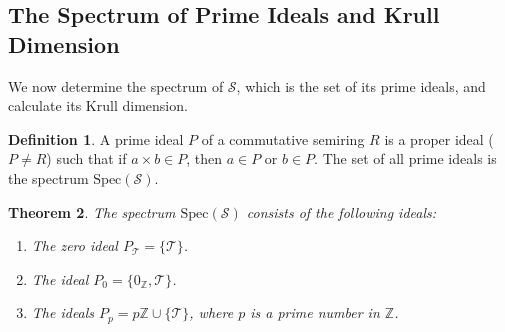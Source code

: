 \documentclass[11pt, a4paper]{article}
\theoremstyle{plain}
\newtheorem{theorem}{Theorem}[section]
\theoremstyle{definition}
\newtheorem{definition}[theorem]{Definition}
\numberwithin{equation}{section}
\newcommand{\Z}{\mathbb{Z}}
\newcommand{\Tobj}{\mathcal{T}} %
\newcommand{\SemiringS}{\mathcal{S}}
\newcommand{\Spec}{\mathrm{Spec}}
\begin{document}
\subsection{The Spectrum of Prime Ideals and Krull Dimension}

We now determine the spectrum of $\SemiringS$, which is the set of its prime ideals, and calculate its Krull dimension.

\begin{definition}
A prime ideal $P$ of a commutative semiring $R$ is a proper ideal ($P \neq R$) such that if $a\times b \in P$, then $a \in P$ or $b \in P$. The set of all prime ideals is the spectrum $\Spec(\SemiringS)$.
\end{definition}

\begin{theorem}\label{thm:prime_ideals_S}
The spectrum $\Spec(\SemiringS)$ consists of the following ideals:
\begin{enumerate}
    \item The zero ideal $P_{\Tobj} = \{\Tobj\}$.
    \item The ideal $P_{0} = \{0_{\Z}, \Tobj\}$.
    \item The ideals $P_{p} = p\Z \cup \{\Tobj\}$, where $p$ is a prime number in $\Z$.
\end{enumerate}
\end{theorem}
\end{document}
